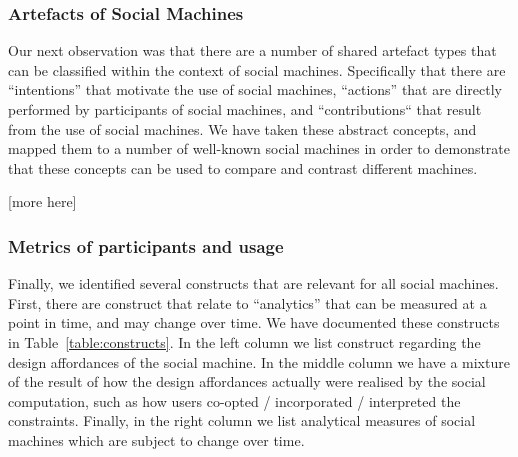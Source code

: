 \documentclass{sig-alternate}
\begin{document}
\subsubsection{Artefacts of Social Machines}

Our next observation was that there are a number of shared artefact types that can be classified within the context of social machines. Specifically that
there are ``intentions'' that motivate the use of social machines, ``actions'' that are directly performed by participants of social machines, and ``contributions``
that result from the use of social machines. We have taken these abstract concepts, and mapped them to a number of well-known social machines in order
to demonstrate that these concepts can be used to compare and contrast different machines.

[more here]


\subsubsection{Metrics of participants and usage}

Finally, we identified several constructs that are relevant for all social machines. First, there are construct that relate to ``analytics'' that can be measured at a point in time, and may change over time. We have documented these constructs in Table~\ref{table:constructs}. In the left column we list construct regarding the design affordances of the social machine. In the middle column we have a mixture of the result of how the design affordances actually were realised by the social computation, such as how users co-opted / incorporated / interpreted the constraints. Finally, in the right column we list analytical measures of social machines which are subject to change over time.
\end{document}
